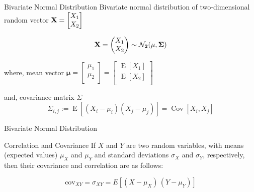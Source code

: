 \documentclass{beamer}
\begin{document}
\begin{frame}{Bivariate Normal Distribution}
Bivariate normal distribution of two-dimensional random vector $\bf{X} =\begin{bmatrix}
X_{1} \\
X_{2} \\
\end{bmatrix}
$

\begin{gather}
	\bf{X} = \begin{pmatrix}
	X_1 \\
	X_2
	\end{pmatrix} \sim \mathcal{N}_2 (\mu , \Sigma)
\end{gather}

where, mean vector $\bm{\mu} =\begin{bmatrix}
\mu_{1} \\
\mu_{2} \\
\end{bmatrix}
=\begin{bmatrix}
\operatorname{E}[X_{1}] \\
\operatorname{E}[X_{2}] \\
\end{bmatrix}
$

and, covariance matrix $\Sigma$
$$\Sigma_{i,j} := \operatorname{E} [(X_i - \mu_i)( X_j - \mu_j)] = \operatorname{Cov}[X_i, X_j] $$
\end{frame}

\begin{frame}{Bivariate Normal Distribution}
	
	
	
	
	
	
	
	
\end{frame}

\begin{frame}{Correlation and Covariance}
If $X$ and $Y$ are two random variables, with means (expected values) $\mu_X$ and $\mu_Y$ and standard deviations $\sigma_X$ and $\sigma_Y$, respectively, then their covariance and correlation are as follows:

$$\text{cov}_{XY} = \sigma_{XY} = E[(X-\mu_X)\,(Y-\mu_Y)] $$

\end{frame}
\end{document}
